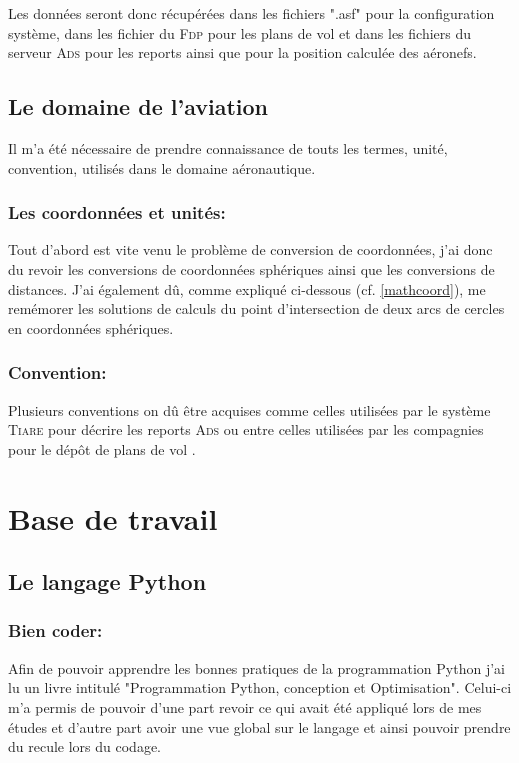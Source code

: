 Les données seront donc récupérées dans les fichiers ".asf" pour la configuration système, dans les fichier du \textsc{Fdp} pour les plans de vol et dans les fichiers du serveur \textsc{Ads} pour les reports ainsi que pour la position calculée des aéronefs.

    \subsection{Le domaine de l'aviation}
Il m'a été nécessaire de prendre connaissance de touts les termes, unité, convention, utilisés dans le domaine aéronautique.

        \subsubsection{Les coordonnées et unités:}
Tout d'abord est vite venu le problème de conversion de coordonnées, j'ai donc du revoir les conversions de coordonnées sphériques ainsi que les conversions de distances.
J'ai également dû, comme expliqué ci-dessous (cf. \vref{mathcoord}), me remémorer les solutions de calculs du point d'intersection de deux arcs de cercles en coordonnées sphériques.

        \subsubsection{Convention:}
Plusieurs conventions on dû être acquises comme celles utilisées par le système \textsc{Tiare} pour décrire les reports \textsc{Ads} ou entre celles utilisées par les compagnies pour le dépôt de plans de vol .





\section{Base de travail}
    \subsection{Le langage Python}
        \subsubsection{Bien coder:\label{pygood}}
Afin de pouvoir apprendre les bonnes pratiques de la programmation Python j'ai lu un livre intitulé "Programmation Python, conception et Optimisation"\cite{pybook}. Celui-ci m'a permis de pouvoir d'une part revoir ce qui avait été appliqué lors de mes études et d'autre part avoir une vue global sur le langage et ainsi pouvoir prendre du recule lors du codage.

